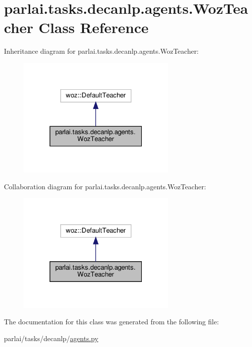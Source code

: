 \hypertarget{classparlai_1_1tasks_1_1decanlp_1_1agents_1_1WozTeacher}{}\section{parlai.\+tasks.\+decanlp.\+agents.\+Woz\+Teacher Class Reference}
\label{classparlai_1_1tasks_1_1decanlp_1_1agents_1_1WozTeacher}


Inheritance diagram for parlai.\+tasks.\+decanlp.\+agents.\+Woz\+Teacher\+:
\nopagebreak
\begin{figure}[H]
\begin{center}
\leavevmode
\includegraphics[width=219pt]{classparlai_1_1tasks_1_1decanlp_1_1agents_1_1WozTeacher__inherit__graph}
\end{center}
\end{figure}


Collaboration diagram for parlai.\+tasks.\+decanlp.\+agents.\+Woz\+Teacher\+:
\nopagebreak
\begin{figure}[H]
\begin{center}
\leavevmode
\includegraphics[width=219pt]{classparlai_1_1tasks_1_1decanlp_1_1agents_1_1WozTeacher__coll__graph}
\end{center}
\end{figure}


The documentation for this class was generated from the following file\+:\begin{DoxyCompactItemize}
\item 
parlai/tasks/decanlp/\hyperlink{parlai_2tasks_2decanlp_2agents_8py}{agents.\+py}\end{DoxyCompactItemize}
